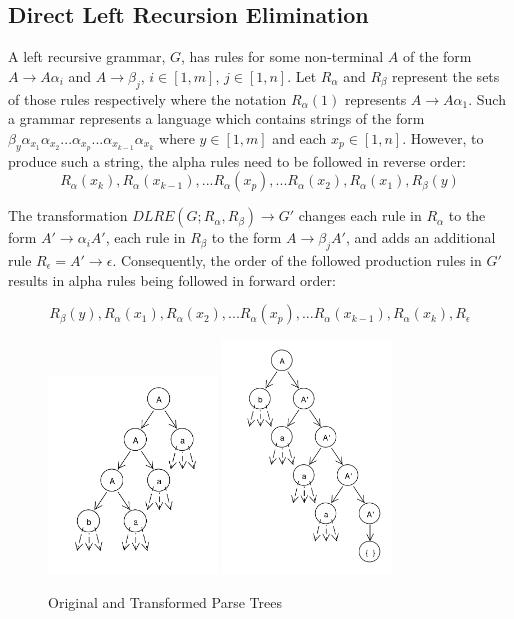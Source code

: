 \documentclass[11pt]{article}
\begin{document}
\subsection{Direct Left Recursion Elimination}
A left recursive grammar, $G$, has rules for some non-terminal $A$ of the form
$A \rightarrow A \alpha_i$ and $A \rightarrow \beta_j$, $i \in [1,m]$, $j \in [1,n]$.
Let $R_\alpha$ and $R_\beta$ represent the sets of those rules respectively where the notation
$R_\alpha(1)$ represents $A \rightarrow A \alpha_1$. 
Such a grammar represents a language which contains strings of the form
$\beta_y \alpha_{x_1} \alpha_{x_2} ... \alpha_{x_p}...\alpha_{x_{k-1}} \alpha_{x_k}$ where $y \in [1,m]$ and each $x_p \in [1,n]$.
However, to produce such a string, the alpha rules need to be followed in reverse order:
\[R_\alpha(x_k), R_\alpha(x_{k-1}), ... R_\alpha(x_{p}), ... R_\alpha(x_2), R_\alpha(x_1), R_\beta(y)\]

The transformation \cite{aho} $DLRE(G; R_\alpha, R_\beta) \rightarrow G'$ changes
each rule in $R_\alpha$ to the form $A' \rightarrow \alpha_i A'$, each rule
in $R_\beta$ to the form $A \rightarrow \beta_j A'$, and adds an additional rule
$R_\epsilon = A' \rightarrow \epsilon$. Consequently, the order of the followed production
rules in $G'$ results in alpha rules being followed in forward order:

\[R_\beta(y), R_\alpha(x_1), R_\alpha(x_2), ... R_\alpha(x_p), ... R_\alpha(x_{k-1}),R_\alpha(x_k), R_\epsilon \]


\begin{figure}[h!]
    \centering
    \includegraphics[width=0.4\textwidth,natwidth=1,natheight=1]{dlre_orig.pdf}
    \includegraphics[width=0.4\textwidth,natwidth=1,natheight=1]{dlre_comp.pdf}
    \caption{Original and Transformed Parse Trees}
    \label{fig:dlre}
\end{figure}
\end{document}

